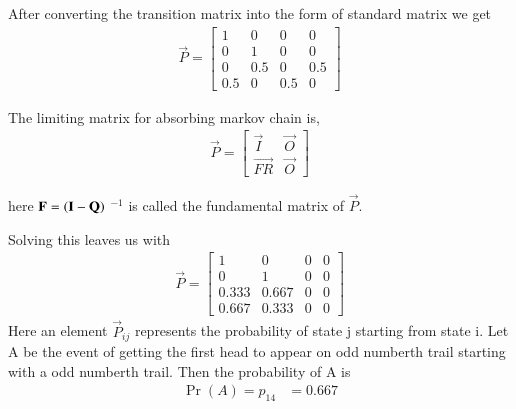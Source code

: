 \documentclass[journal,12pt,twocolumn]{IEEEtran}
\begin{document}
After converting the transition matrix into the form of standard matrix we get
\begin{align} \vec{P} = 
\begin{bmatrix}
1 & 0 & 0 & 0 \\
0 & 1 & 0 & 0 \\
0 & 0.5 & 0 & 0.5 \\
0.5 & 0 & 0.5 & 0 
\end{bmatrix}
\end{align}
\begin{lemma}

The limiting matrix for absorbing markov chain is,
\begin{align}
\vec{P}= 
\begin{bmatrix}
\vec{I} & \vec{O} \\
\vec{FR} & \vec{O}
\end{bmatrix}
\end{align}

here $\mathbf{F}=\left(\mathbf{I}-\mathbf{Q}\right)$ $^{-1}$ is called the fundamental matrix of $\vec{P}.$
\end{lemma}
Solving this leaves us with 
\begin{align}
\vec{P} = 
\begin{bmatrix}
1 & 0 & 0 & 0 \\
0 & 1 & 0 & 0 \\
0.333 & 0.667 & 0 & 0 \\
0.667 & 0.333 & 0 & 0
\end{bmatrix}
\end{align}
Here an element $\vec{P}_{ij}$ represents the probability of state j starting from state i. Let A be the event of getting the first head to appear on odd numberth trail starting with a odd numberth trail. Then the probability of A is   
\begin{align}
   \Pr(A) = p_{14} 
   & = 0.667
\end{align}
\end{document}
